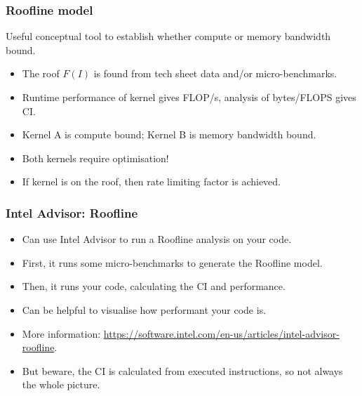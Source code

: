 \documentclass{beamer}
\begin{document}
\begin{frame}
\frametitle{Roofline model}
Useful conceptual tool to establish whether compute or memory bandwidth bound.

\begin{center}
\begin{adjustbox}{max width={.6\textwidth}}
\end{adjustbox}
\end{center}

\begin{itemize}
  \item The roof $F(I)$ is found from tech sheet data and/or micro-benchmarks.
  \item Runtime performance of kernel gives FLOP/s, analysis of bytes/FLOPS gives CI.
  \item Kernel A is compute bound; Kernel B is memory bandwidth bound.
  \item Both kernels require optimisation!
  \item If kernel is on the roof, then rate limiting factor is achieved.
\end{itemize}
\end{frame}

\begin{frame}
\frametitle{Intel Advisor: Roofline}
\begin{itemize}
  \item Can use Intel Advisor to run a Roofline analysis on your code.
  \item First, it runs some micro-benchmarks to generate the Roofline model.
  \item Then, it runs your code, calculating the CI and performance.
  \item Can be helpful to visualise how performant your code is.
  \item More information: \url{https://software.intel.com/en-us/articles/intel-advisor-roofline}.
  \item But beware, the CI is calculated from executed instructions, so not always the whole picture.
\end{itemize}
\end{frame}
\end{document}
